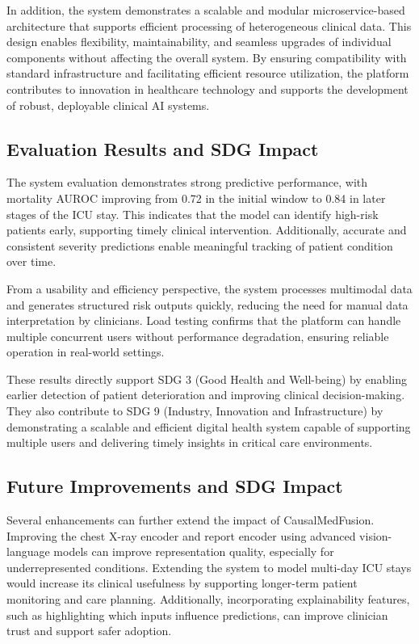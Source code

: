 \documentclass{fisatprojectfinal}
\begin{document}
In addition, the system demonstrates a scalable and modular microservice-based architecture that supports efficient processing of heterogeneous clinical data. This design enables flexibility, maintainability, and seamless upgrades of individual components without affecting the overall system. By ensuring compatibility with standard infrastructure and facilitating efficient resource utilization, the platform contributes to innovation in healthcare technology and supports the development of robust, deployable clinical AI systems.

\subsection{Evaluation Results and SDG Impact}

The system evaluation demonstrates strong predictive performance, with mortality AUROC improving from 0.72 in the initial window to 0.84 in later stages of the ICU stay. This indicates that the model can identify high-risk patients early, supporting timely clinical intervention. Additionally, accurate and consistent severity predictions enable meaningful tracking of patient condition over time.

From a usability and efficiency perspective, the system processes multimodal data and generates structured risk outputs quickly, reducing the need for manual data interpretation by clinicians. Load testing confirms that the platform can handle multiple concurrent users without performance degradation, ensuring reliable operation in real-world settings. 

These results directly support SDG 3 (Good Health and Well-being) by enabling earlier detection of patient deterioration and improving clinical decision-making. They also contribute to SDG 9 (Industry, Innovation and Infrastructure) by demonstrating a scalable and efficient digital health system capable of supporting multiple users and delivering timely insights in critical care environments. 



\subsection{Future Improvements and SDG Impact}

Several enhancements can further extend the impact of CausalMedFusion. Improving the chest X-ray encoder and report encoder using advanced vision-language models can improve representation quality, especially for underrepresented conditions. Extending the system to model multi-day ICU stays would increase its clinical usefulness by supporting longer-term patient monitoring and care planning. Additionally, incorporating explainability features, such as highlighting which inputs influence predictions, can improve clinician trust and support safer adoption.\\
\end{document}
